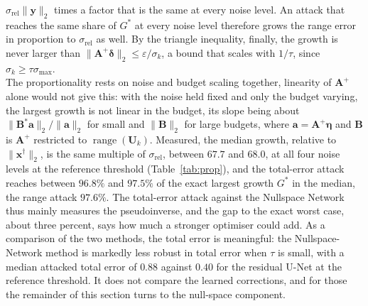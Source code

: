 \documentclass{article}
\numberwithin{equation}{section}
\begin{document}
$\sigma_\text{rel}\lVert\mathbf{y}\rVert_2$ times a factor that is the same at every noise level. An attack that
reaches the same share of $G^*$ at every noise level therefore grows the range error in proportion to
$\sigma_\text{rel}$ as well. By the triangle inequality, finally, the growth is never larger than
$\lVert\mathbf{A}^{+}\boldsymbol{\delta}\rVert_2\leq\varepsilon/\sigma_k$, a bound that scales with $1/\tau$,
since $\sigma_k\geq\tau\sigma_{\max}$.\\
The proportionality rests on noise and budget scaling together, linearity of $\mathbf{A}^{+}$ alone would not give this: with the noise held fixed and only the budget
varying, the largest growth is not linear in the budget, its slope being about
$\lVert\mathbf{B}^{*}\mathbf{a}\rVert_2/\lVert\mathbf{a}\rVert_2$ for small and $\lVert\mathbf{B}\rVert_2$ for large
budgets, where $\mathbf{a}=\mathbf{A}^{+}\boldsymbol{\eta}$ and $\mathbf{B}$ is $\mathbf{A}^{+}$ restricted to
$\operatorname{range}(\mathbf{U}_k)$. Measured, the median growth, relative to
$\lVert\mathbf{x}^\dagger\rVert_2$, is the same multiple of $\sigma_\text{rel}$, between $67.7$ and $68.0$,
at all four noise levels at the reference threshold (Table~\ref{tab:prop}), and the total-error attack
reaches between $96.8\%$ and $97.5\%$ of the exact largest growth $G^*$ in the median, the range attack
$97.6\%$. The total-error attack against the
Nullspace Network thus mainly measures the pseudoinverse, and the gap to the exact worst case, about three
percent, says how much a stronger optimiser could add. As a comparison of the two methods, the total error is meaningful: the
Nullspace-Network method is markedly less robust in total error when $\tau$ is small, with a
median attacked total error of $0.88$ against $0.40$ for the residual U-Net at the reference threshold.
It does not compare the learned corrections, and for those the remainder of this section turns to the
null-space component.
\end{document}
